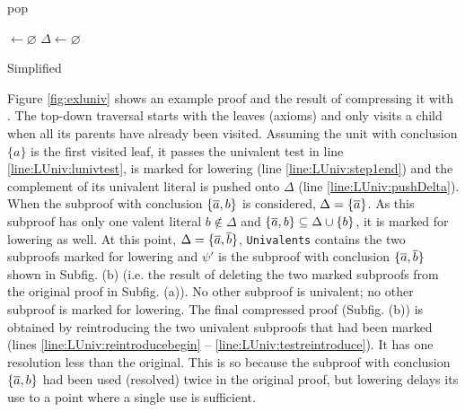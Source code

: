 \documentclass{llncs}
\begin{document}
\begin{algorithm}[bt]
  \BlankLine

   {pop}

  \Univ $\leftarrow \varnothing$ \;
  $\Delta \leftarrow \varnothing$ \;
  \BlankLine

  \BlankLine


  \caption{Simplified \LowerUnivalents}
  \label{algo:LUniv}
\end{algorithm}


Figure \ref{fig:exluniv} shows an example proof and the result of compressing it with \LowerUnivalents. The top-down traversal starts with the leaves (axioms) and only visits a child when all its parents have already been visited. Assuming the unit with conclusion $\{a\}$ is the first visited leaf, it passes the univalent test in line \ref{line:LUniv:lunivtest}, is marked for lowering (line \ref{line:LUniv:step1end}) and the complement of its univalent literal is pushed onto $\Delta$ (line \ref{line:LUniv:pushDelta}). When the subproof with
conclusion $\{\overline{a},b\}$ is considered, $\Delta = \{\overline{a}\}$. As this subproof has only one
valent literal $b \notin \Delta$ and $\{\overline{a},b\} \subseteq \Delta \cup \{b\}$, it is
marked for lowering as well. At this point, $\Delta = \{\overline{a}, \overline{b}\}$, \texttt{Univalents} contains the two subproofs marked for lowering and $\psi'$ is the subproof with conclusion $\{\overline{a}, \overline{b}\}$ shown in Subfig. (b) (i.e. the result of deleting the two marked subproofs from the original proof in Subfig. (a)). No other subproof is univalent; no other subproof is marked for lowering. The final compressed proof (Subfig. (b)) is obtained by reintroducing the two univalent subproofs that had been marked (lines \ref{line:LUniv:reintroducebegin} -- \ref{line:LUniv:testreintroduce}). It has one resolution less than the original. This is so because the subproof with conclusion $\{\overline{a},b\}$ had been used (resolved) twice in the original proof, but lowering delays its use to a point where a single use is sufficient.
\end{document}
